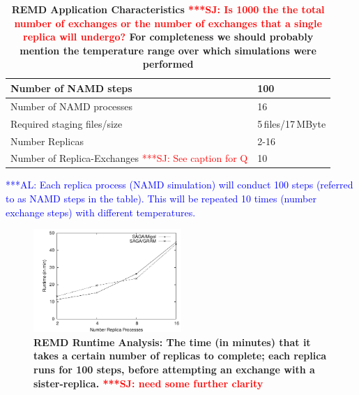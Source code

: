 \documentclass[times, 10pt, twocolumn]{article}
\newcommand{\alnote}[1]{ {\textcolor{blue} { ***AL: #1 }}}
\newcommand{\jhanote}[1]{ {\textcolor{red} { ***SJ: #1 }}}
\newcommand{\alnote}[1]{}
\newcommand{\jhanote}[1]{}
\newcommand{\up}{\vspace*{-1em}}
\begin{document}
\begin{table}        
    \centering
	\begin{tabular}{|p{5cm}|l|}
          \hline
          Number of NAMD steps &100\\ \hline 
          Number of NAMD processes &16\\ \hline 
          Required staging files/size &5\,files/17\,MByte\\ \hline
          Number Replicas &2-16 \\ \hline
          Number of Replica-Exchanges \jhanote{See caption for Q} &10\\ \hline
	\end{tabular}
	\caption{\small \bf REMD Application Characteristics\label{tab:app_stats}
          \jhanote{Is 1000 the the total number of exchanges or the
            number of exchanges that a single replica will undergo?}
          For completeness we should probably mention the temperature
          range over which simulations were performed}
          \alnote{Each replica process (NAMD simulation) will conduct 
          100 steps (referred to as NAMD steps in the table). This 
          will be repeated 10 times (number exchange steps) with 
          different temperatures.}
          \up\up
\end{table}   

\begin{figure}[htb]
    \centering
    \hspace*{-20pt}
        \includegraphics[width=0.5\textwidth]{performance/perf_remd.pdf}
        \caption{\small \bf REMD Runtime Analysis: The time (in minutes) that it
          takes a certain number of replicas to complete; each replica
          runs for 100 steps, before attempting an exchange with a
          sister-replica. \jhanote{need some further clarity}
          \up\up}
    \label{fig:performance_perf_runtime}
\end{figure}     
\end{document}
